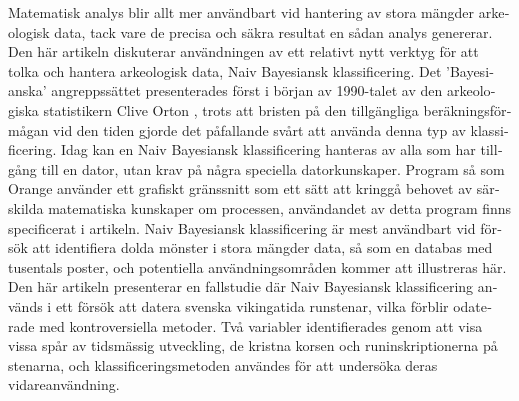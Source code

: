 \begin{myabstract}
\foreignlanguage{swedish}{%
	Matematisk analys blir allt mer användbart vid hantering av stora mängder arkeologisk data, tack vare de precisa och säkra resultat en sådan analys genererar. Den här artikeln diskuterar användningen av ett relativt nytt verktyg för att tolka och hantera arkeologisk data, Naiv Bayesiansk klassificering. Det ’Bayesianska’ angreppssättet presenterades först i början av 1990-talet av den arkeologiska statistikern Clive Orton  \parencites[139]{Orton_1992}[1]{Buck_1996}, trots att bristen på den tillgängliga beräkningsförmågan vid den tiden gjorde det påfallande svårt att använda denna typ av klassificering. Idag kan en Naiv Bayesiansk klassificering hanteras av alla som har tillgång till en dator, utan krav på några speciella datorkunskaper. Program så som Orange använder ett grafiskt gränssnitt som ett sätt att kringgå behovet av särskilda matematiska kunskaper om processen, användandet av detta program finns specificerat i artikeln. Naiv Bayesiansk klassificering är mest användbart vid försök att identifiera dolda mönster i stora mängder data, så som en databas med tusentals poster, och potentiella användningsområden kommer att illustreras här. 
	Den här artikeln presenterar en fallstudie där Naiv Bayesiansk klassificering används i ett försök att datera svenska vikingatida runstenar, vilka förblir odaterade med kontroversiella metoder. Två variabler identifierades genom att visa vissa spår av tidsmässig utveckling, de kristna korsen och runinskriptionerna på stenarna, och klassificeringsmetoden användes för att undersöka deras vidareanvändning.}

\end{myabstract}
\printbibliography[heading=subbibnumbered] 
\label{thoeming:lastpage}
\closingarticle

